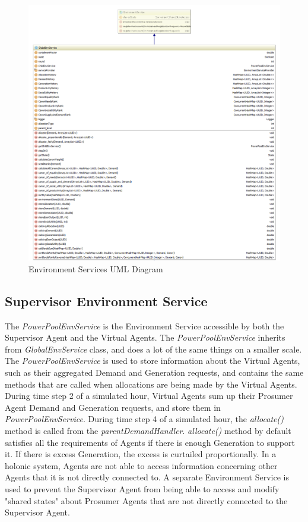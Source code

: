 \begin{figure}[!h]
	\centering
	\includegraphics[scale=0.3]{Images/EnvironmentUML-1.png}
	\caption{Environment Services UML Diagram}
	\label{fig:ServiceUML}
\end{figure}


\subsection*{Supervisor Environment Service}
The \textit{PowerPoolEnvService} is the Environment Service accessible by both the Supervisor Agent and the Virtual Agents. The \textit{PowerPoolEnvService} inherits from \textit{GlobalEnvService} class, and does a lot of the same things on a smaller scale.  The \textit{PowerPoolEnvService} is used to store information about the Virtual Agents, such as their aggregated Demand and Generation requests, and contains the same methods that are called when allocations are being made by the Virtual Agents. During time step 2 of a simulated hour, Virtual Agents sum up their Prosumer Agent Demand and Generation requests, and store them in \textit{PowerPoolEnvService}. During time step 4 of a simulated hour, the \textit{allocate()} method is called from the \textit{parentDemandHandler}. \textit{allocate()} method by default satisfies all the requirements of Agents if there is enough Generation to support it. If there is excess Generation, the excess is curtailed proportionally. In a holonic system, Agents are not able to access information concerning other Agents that it is not directly connected to. A separate Environment Service is used to prevent the Supervisor Agent from being able to access and modify "shared states" about Prosumer Agents that are not directly connected to the Supervisor Agent.

